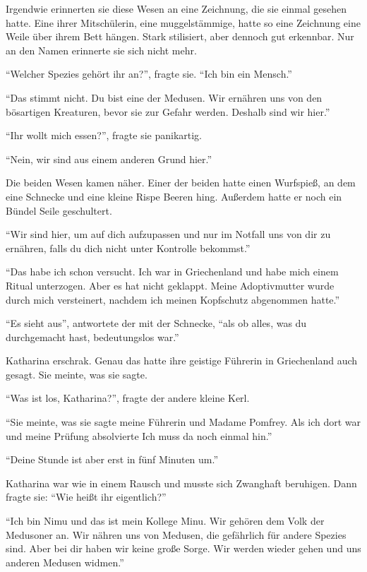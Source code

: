 Irgendwie erinnerten sie diese Wesen an eine Zeichnung, die sie einmal gesehen hatte. Eine ihrer Mitschülerin, eine muggelstämmige, hatte so eine Zeichnung eine Weile über ihrem Bett hängen. Stark stilisiert, aber dennoch gut erkennbar. Nur an den Namen erinnerte sie sich nicht mehr.

\enquote{Welcher Spezies gehört ihr an?}, fragte sie. \enquote{Ich bin ein Mensch.}

\enquote{Das stimmt nicht. Du bist eine der Medusen. Wir ernähren uns von den bösartigen Kreaturen, bevor sie zur Gefahr werden. Deshalb sind wir hier.}

\enquote{Ihr wollt mich essen?}, fragte sie panikartig.

\enquote{Nein, wir sind aus einem anderen Grund hier.}

Die beiden Wesen kamen näher. Einer der beiden hatte einen Wurfspieß, an dem eine Schnecke und eine kleine Rispe Beeren hing. Außerdem hatte er noch ein Bündel Seile geschultert.

\enquote{Wir sind hier, um auf dich aufzupassen und nur im Notfall uns von dir zu ernähren, falls du dich nicht unter Kontrolle bekommst.}

\enquote{Das habe ich schon versucht. Ich war in Griechenland und habe mich einem Ritual unterzogen. Aber es hat nicht geklappt. Meine Adoptivmutter wurde durch mich versteinert, nachdem ich meinen Kopfschutz abgenommen hatte.}

\enquote{Es sieht aus}, antwortete der mit der Schnecke, \enquote{als ob alles, was du durchgemacht hast, bedeutungslos war.}

Katharina erschrak. Genau das hatte ihre geistige Führerin in Griechenland auch gesagt. Sie meinte, was sie sagte.

\enquote{Was ist los, Katharina?}, fragte der andere kleine Kerl.

\enquote{Sie meinte, was sie sagte \gst meine Führerin \gst und Madame Pomfrey. Als ich dort war und meine Prüfung absolvierte \gst Ich muss da noch einmal hin.}

\enquote{Deine Stunde ist aber erst in fünf Minuten um.}

Katharina war wie in einem Rausch und musste sich Zwanghaft beruhigen. Dann fragte sie: \enquote{Wie heißt ihr eigentlich?}

\enquote{Ich bin Nimu und das ist mein Kollege Minu. Wir gehören dem Volk der Medusoner an. Wir nähren uns von Medusen, die gefährlich für andere Spezies sind. Aber bei dir haben wir keine große Sorge. Wir werden wieder gehen und uns anderen Medusen widmen.}

